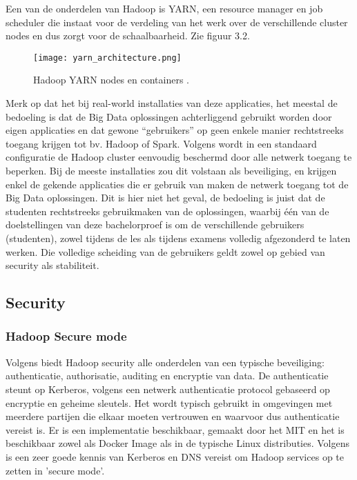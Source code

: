 Een van de onderdelen van Hadoop is YARN, een resource manager en job scheduler die instaat voor de verdeling van het werk over de verschillende cluster nodes en dus zorgt voor de schaalbaarheid. Zie figuur 3.2.
\newline
\begin{figure}[H]
    \texttt{[image: yarn\_architecture.png]}
    \caption{Hadoop YARN nodes en containers \autocite{Hadoop2023d}.}
\end{figure}

Merk op dat het bij real-world installaties van deze applicaties, het meestal de bedoeling is dat de Big Data oplossingen achterliggend gebruikt worden door eigen applicaties en dat gewone ``gebruikers'' op geen enkele manier rechtstreeks toegang krijgen tot bv. Hadoop of Spark.
\newline
Volgens \autocite{Hadoop2023} wordt in een standaard configuratie de Hadoop cluster eenvoudig beschermd door alle netwerk toegang te beperken. 
Bij de meeste installaties zou dit volstaan als beveiliging, en krijgen enkel de gekende applicaties die er gebruik van maken de netwerk toegang tot de Big Data oplossingen.
\newline
\newline
Dit is hier niet het geval, de bedoeling is juist dat de studenten rechtstreeks gebruikmaken van de oplossingen, waarbij één van de doelstellingen van deze bachelorproef is om de verschillende gebruikers (studenten), zowel tijdens de les als tijdens examens volledig afgezonderd te laten werken. Die volledige scheiding van de gebruikers geldt zowel op gebied van security als stabiliteit.

\subsection{Security}

\subsubsection{Hadoop Secure mode}
Volgens \textcite{Kiran2022} biedt Hadoop security alle onderdelen van een typische beveiliging: authenticatie, authorisatie, auditing en encryptie van data.
De authenticatie steunt op Kerberos, volgens \textcite{Kerberos2023} een netwerk authenticatie protocol gebaseerd op encryptie en geheime sleutels. Het wordt typisch gebruikt in omgevingen met meerdere partijen die elkaar moeten vertrouwen en waarvoor dus authenticatie vereist is. Er is een implementatie beschikbaar, gemaakt door het MIT en het is beschikbaar zowel als Docker Image als in de typische Linux distributies.
\newline
Volgens \textcite{Hadoop2023} is een zeer goede kennis van Kerberos en DNS vereist om Hadoop services op te zetten in 'secure mode'.

